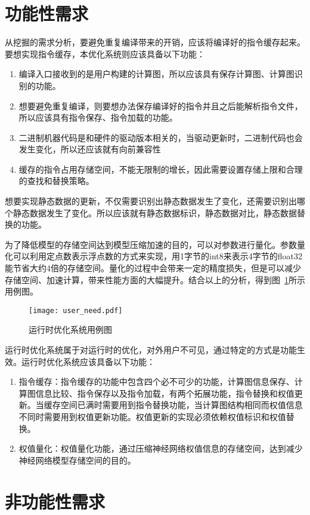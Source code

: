 \section {功能性需求}
从挖掘的需求分析，要避免重复编译带来的开销，应该将编译好的指令缓存起来。要想实现指令缓存，本优化系统则应该具备以下功能：
\begin{enumerate}
  \item 编译入口接收到的是用户构建的计算图，所以应该具有保存计算图、计算图识别的功能。
  \item 想要避免重复编译，则要想办法保存编译好的指令并且之后能解析指令文件，所以应该具有指令保存、指令加载的功能。
  \item 二进制机器代码是和硬件的驱动版本相关的，当驱动更新时，二进制代码也会发生变化，所以还应该就有向前兼容性
  \item 缓存的指令占用存储空间，不能无限制的增长，因此需要设置存储上限和合理的查找和替换策略。
\end{enumerate}

想要实现静态数据的更新，不仅需要识别出静态数据发生了变化，还需要识别出哪个静态数据发生了变化。所以应该就有静态数据标识，静态数据对比，静态数据替换的功能。

为了降低模型的存储空间达到模型压缩加速的目的，可以对参数进行量化。参数量化可以利用定点数表示浮点数的方式来实现，用1字节的int8来表示4字节的float32能节省大约4倍的存储空间。量化的过程中会带来一定的精度损失，但是可以减少存储空间、加速计算，带来性能方面的大幅提升。结合以上的分析，得到图~\ref{fig:user-need}所示用例图。

\begin{figure}[htb]
  \centering
  \texttt{[image: user\_need.pdf]}
  \caption{运行时优化系统用例图}
  \label{fig:user-need}
\end{figure}

运行时优化系统属于对运行时的优化，对外用户不可见，通过特定的方式是功能生效。运行时优化系统应该具备以下功能：
\begin{enumerate}
  \item 指令缓存：指令缓存的功能中包含四个必不可少的功能，计算图信息保存、计算图信息比较、指令保存以及指令加载，有两个拓展功能，指令替换和权值更新。当缓存空间已满时需要用到指令替换功能，当计算图结构相同而权值信息不同时需要用到权值更新功能。权值更新的实现必须依赖权值标识和权值替换。
  \item 权值量化：权值量化功能，通过压缩神经网络权值信息的存储空间，达到减少神经网络模型存储空间的目的。
\end{enumerate}

\section {非功能性需求}

